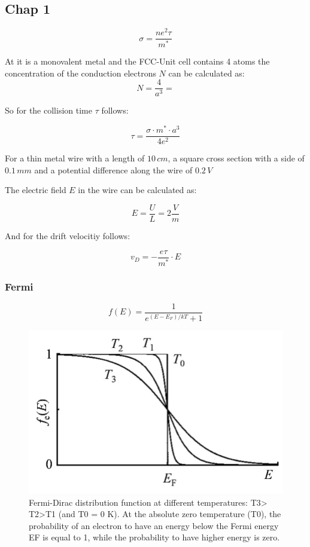 \subsection{Chap 1 } \label{chap1}

\begin{equation}
    \sigma = \frac{n e^2 \tau}{m^*}
\end{equation}


At it is a monovalent metal and the FCC-Unit cell contains 
4 atoms the concentration of the conduction electrons $N$ can be
calculated as:
$$N =\frac{4}{a^3} = $$

So for the collision time $\tau$ follows:

$$\tau = \frac{\sigma \cdot m^* \cdot a^3}{4e^2}$$

For a thin metal wire with a length of $10 \, cm$, a square cross section with 
a side of $0.1 \, mm$ and a potential difference along the wire of $0.2 \, V$

The electric field $E$ in the wire can be calculated as: 

$$E = \frac{U}{L} = 2 \frac{V}{m}$$

And for the drift velocitiy follows:

$$v_D =  -\frac{e \tau}{m^*} \cdot E$$

\subsubsection*{Fermi}

\begin{equation}
    f(E) = \frac{1}{e^{(E-E_F)/kT}+1}
\end{equation}

\begin{figure}[H]
    \centering
    \includegraphics[width=0.5\linewidth]{Graphics/Chapter1/Fermi-Dirac-distribution.png}
    \caption{Fermi-Dirac distribution function at different temperatures: T3> T2>T1
     (and T0 = 0 K). At the absolute zero temperature (T0), the probability of an 
     electron to have an energy below the Fermi energy EF is equal to 1, while the 
     probability to have higher energy is zero.}
    \label{}
\end{figure}



